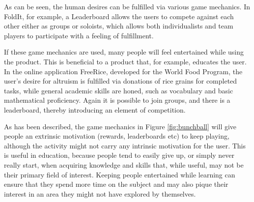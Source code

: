 As can be seen, the human desires can be fulfilled via various game mechanics. In FoldIt, for example, a Leaderboard allows the users to compete against each other either as groups or soloists, which allows both individualists and team players to participate with a feeling of fulfillment. 

If these game mechanics are used, many people will feel entertained while using the product. This is beneficial to a product that, for example, educates the user. In the online application FreeRice, developed for the World Food Program, the user's desire for altruism is fulfilled via donations of rice grains for completed tasks, while general academic skills are honed, such as vocabulary and basic mathematical proficiency. Again it is possible to join groups, and there is a leaderboard, thereby introducing an element of competition.\cite{freerice}

As has been described, the game mechanics in Figure \ref{fig:bunchball} will give people an extrinsic motivation (rewards, leaderboards etc) to keep playing, although the activity might not carry any intrinsic motivation for the user. This is useful in education, because people tend to easily give up, or simply never really start, when acquiring knowledge and skills that, while useful, may not be their primary field of interest. Keeping people entertained while learning can ensure that they spend more time on the subject and may also pique their interest in an area they might not have explored by themselves.